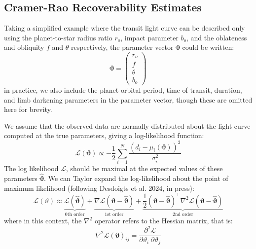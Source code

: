 \documentclass[twocolumn]{aastex631}
\begin{document}
\subsection{Cramer-Rao Recoverability Estimates}
\label{sec:rec} 
Taking a simplified example where the transit light curve can be described only using the planet-to-star radius ratio $r_o$, impact parameter $b_o$, and the oblateness and obliquity $f$ and $\theta$ respectively, the parameter vector $\boldsymbol{\vartheta}$  could be written:
\begin{equation} \label{eq:paramvector}
    \boldsymbol{\vartheta} = 
    \begin{pmatrix}
    r_o \\
    f \\
    \theta \\
    b_o
\end{pmatrix}
\end{equation}
in practice, we also include the planet orbital period, time of transit, duration, and limb darkening parameters in the parameter vector, though these are omitted here for brevity.

We assume that the observed data are normally distributed about the light curve computed at the true parameters, giving a log-likelihood function:
\begin{equation}
    \mathcal{L}(\boldsymbol{\vartheta}) \propto -\frac{1}{2} \sum_{i=1}^{N} \frac{(d_i - \mu_i(\boldsymbol{\vartheta}))^2}{\sigma_i^2}
\end{equation}
The log likelihood $\mathcal{L}$, should be maximal at the expected values of these parameters $\boldsymbol{\hat{\vartheta}}$. We can Taylor expand the log-likelihood about the point of maximum likelihood (following Desdoigts et al. 2024, in press):
\begin{equation} \label{eq:taylor}
    \mathcal{L}(\vartheta) \approx 
    \underbrace{\mathcal{L}(\hat{\boldsymbol{\vartheta}})}_{\text{0th order}}
    + \underbrace{\nabla \mathcal{L}(\boldsymbol{\vartheta} - \hat{\boldsymbol{\vartheta}})}_{\text{1st order}} + \underbrace{\frac{1}{2}(\boldsymbol{\vartheta} - \hat{\boldsymbol{\vartheta}})^\top \nabla^2 \mathcal{L}(\boldsymbol{\vartheta} - \hat{\boldsymbol{\vartheta}})}_{\text{2nd order}}
\end{equation}
where in this context, the $\nabla^2$ operator refers to the Hessian matrix, that is:
\begin{equation*}
    \nabla^2 \mathcal{L}(\boldsymbol{\vartheta})_{ij} = \frac{\partial^2 \mathcal{L}}{\partial\vartheta_i\ \partial\vartheta_j}
\end{equation*}
\end{document}
